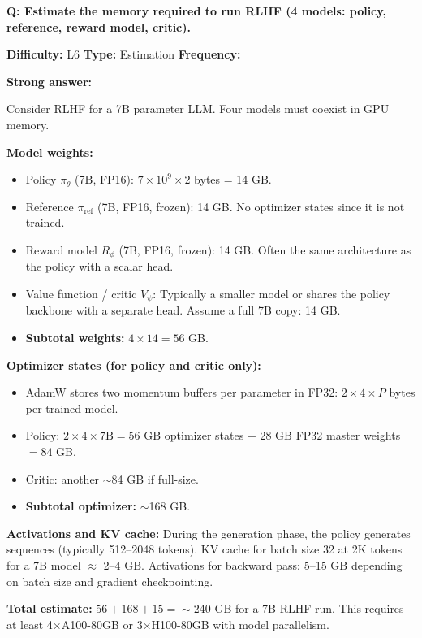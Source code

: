 \begin{interviewq}
\textbf{Q: Estimate the memory required to run RLHF (4 models: policy, reference, reward model, critic).}

\textbf{Difficulty:} L6 \quad \textbf{Type:} Estimation \quad \textbf{Frequency:} \freqmed{}

\textbf{Strong answer:}

Consider RLHF for a 7B parameter LLM. Four models must coexist in GPU memory.

\textbf{Model weights:}
\begin{itemize}
    \item Policy $\pi_\theta$ (7B, FP16): $7 \times 10^9 \times 2$ bytes = 14 GB.
    \item Reference $\pi_{\text{ref}}$ (7B, FP16, frozen): 14 GB. No optimizer states since it is not trained.
    \item Reward model $R_\phi$ (7B, FP16, frozen): 14 GB. Often the same architecture as the policy with a scalar head.
    \item Value function / critic $V_\psi$: Typically a smaller model or shares the policy backbone with a separate head. Assume a full 7B copy: 14 GB.
    \item \textbf{Subtotal weights:} $4 \times 14 = 56$ GB.
\end{itemize}

\textbf{Optimizer states (for policy and critic only):}
\begin{itemize}
    \item AdamW stores two momentum buffers per parameter in FP32: $2 \times 4 \times P$ bytes per trained model.
    \item Policy: $2 \times 4 \times 7\text{B} = 56$ GB optimizer states + 28 GB FP32 master weights $= 84$ GB.
    \item Critic: another $\sim$84 GB if full-size.
    \item \textbf{Subtotal optimizer:} $\sim$168 GB.
\end{itemize}

\textbf{Activations and KV cache:} During the generation phase, the policy generates sequences (typically 512--2048 tokens). KV cache for batch size 32 at 2K tokens for a 7B model $\approx$ 2--4 GB. Activations for backward pass: 5--15 GB depending on batch size and gradient checkpointing.

\textbf{Total estimate:} $56 + 168 + 15 = \sim$240 GB for a 7B RLHF run. This requires at least 4$\times$A100-80GB or 3$\times$H100-80GB with model parallelism.


\end{interviewq}
